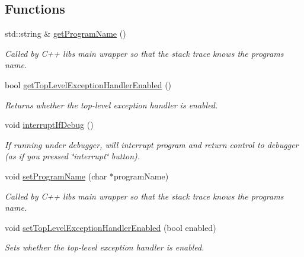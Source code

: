 \subsection*{Functions}
\begin{DoxyCompactItemize}
\item 
std\+::string \& \mbox{\hyperlink{namespacesgl_1_1exceptions_a7056566d5a77c39b9b0bc7060426db66}{get\+Program\+Name}} ()
\begin{DoxyCompactList}\small\item\em Called by C++ lib\textquotesingle{}s main wrapper so that the stack trace knows the program\textquotesingle{}s name. \end{DoxyCompactList}\item 
bool \mbox{\hyperlink{namespacesgl_1_1exceptions_a6a3658a12893a1ea2acaa6fc6e8b6d82}{get\+Top\+Level\+Exception\+Handler\+Enabled}} ()
\begin{DoxyCompactList}\small\item\em Returns whether the top-\/level exception handler is enabled. \end{DoxyCompactList}\item 
void \mbox{\hyperlink{namespacesgl_1_1exceptions_ac271a27f160c64bf051b5daf6e0fe6a1}{interrupt\+If\+Debug}} ()
\begin{DoxyCompactList}\small\item\em If running under debugger, will interrupt program and return control to debugger (as if you pressed \char`\"{}interrupt\char`\"{} button). \end{DoxyCompactList}\item 
void \mbox{\hyperlink{namespacesgl_1_1exceptions_a47c669ec573608d439258c48c202d58a}{set\+Program\+Name}} (char $\ast$program\+Name)
\begin{DoxyCompactList}\small\item\em Called by C++ lib\textquotesingle{}s main wrapper so that the stack trace knows the program\textquotesingle{}s name. \end{DoxyCompactList}\item 
void \mbox{\hyperlink{namespacesgl_1_1exceptions_aecffab3c2119276b44cb55564b11e520}{set\+Top\+Level\+Exception\+Handler\+Enabled}} (bool enabled)
\begin{DoxyCompactList}\small\item\em Sets whether the top-\/level exception handler is enabled. \end{DoxyCompactList}\end{DoxyCompactItemize}


